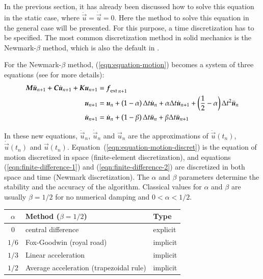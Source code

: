 In the previous section, it has already been discussed how to solve this
equation in the static case, where $\ddot{\vec{u}} = \dot{\vec{u}} = 0$.  Here
the method to solve this equation in the general case will be presented.  For
this purpose, a time discretization has to be specified.  The most common
discretization method in solid mechanics is the Newmark-$\beta$ method, which is
also the default in \akantu.

For the Newmark-$\beta$ method, (\ref{eqn:equation-motion}) becomes a
system of three equations (see \cite{curnier92a} \cite{hughes-83a} for
more details):
\begin{align}
\boldsymbol{M} \ddot{\boldsymbol{u}}_{n+1} + \boldsymbol{C}\dot{\boldsymbol{u}}_{n+1} + \boldsymbol{K} \boldsymbol{u}_{n+1} &={\boldsymbol{f}_{{\mathrm{ext}}}}_{\, n+1}
\label{eqn:equation-motion-discret} \\
\boldsymbol{u}_{n+1} &=\boldsymbol{u}_{n} + \left(1 - \alpha\right) \Delta t \dot{\boldsymbol{u}}_{n} +
\alpha \Delta t \dot{\boldsymbol{u}}_{n+1} + \left(\frac{1}{2} -
\alpha\right) \Delta t^2
\ddot{\boldsymbol{u}}_{n} \label{eqn:finite-difference-1}\\
\dot{\boldsymbol{u}}_{n+1} &= \dot{\boldsymbol{u}}_{n} + \left(1 - \beta\right)
\Delta t \ddot{\boldsymbol{u}}_{n} + \beta \Delta t
\ddot{\boldsymbol{u}}_{n+1} \label{eqn:finite-difference-2}
\end{align}

In these new equations, $\ddot{\vec{u}}_{n}$, $\dot{\vec{u}}_{n}$ and
$\vec{u}_{n}$ are the approximations of $\ddot{\vec{u}}(t_n)$,
$\dot{\vec{u}}(t_n)$ and $\vec{u}(t_n)$.
Equation~(\ref{eqn:equation-motion-discret}) is the equation of motion
discretized in space (finite-element discretization), and equations
(\ref{eqn:finite-difference-1}) and (\ref{eqn:finite-difference-2})
are discretized in both space and time (Newmark discretization).  The
$\alpha$ and $\beta$ parameters determine the stability and the
accuracy of the algorithm. Classical values for $\alpha$ and $\beta$
are usually $\beta = 1/2$ for no numerical damping and $0 < \alpha <
1/2$.

\begin{center}
  \begin{tabular}{cll}
    \toprule
    $\alpha$ & Method ($\beta = 1/2$) & Type\\
    \midrule
    $0$ & central difference & explicit\\
    $1/6$ & Fox-Goodwin (royal road) &implicit\\
    $1/3$ & Linear acceleration &implicit\\
    $1/2$ & Average acceleration (trapezoidal rule)& implicit\\
    \bottomrule
  \end{tabular}
\end{center}


